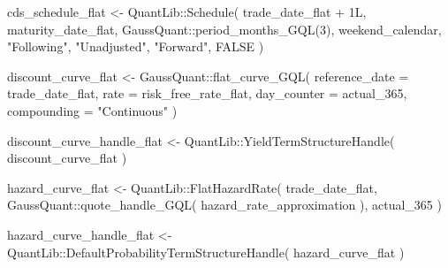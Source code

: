 \documentclass[
  letterpaper,
  DIV=11,
  numbers=noendperiod]{scrreprt}
\newenvironment{Shaded}{\begin{snugshade}}{\end{snugshade}}
\newcommand{\AttributeTok}[1]{\textcolor[rgb]{0.40,0.45,0.13}{#1}}
\newcommand{\ConstantTok}[1]{\textcolor[rgb]{0.56,0.35,0.01}{#1}}
\newcommand{\DecValTok}[1]{\textcolor[rgb]{0.68,0.00,0.00}{#1}}
\newcommand{\FunctionTok}[1]{\textcolor[rgb]{0.28,0.35,0.67}{#1}}
\newcommand{\NormalTok}[1]{\textcolor[rgb]{0.00,0.23,0.31}{#1}}
\newcommand{\OtherTok}[1]{\textcolor[rgb]{0.00,0.23,0.31}{#1}}
\newcommand{\SpecialCharTok}[1]{\textcolor[rgb]{0.37,0.37,0.37}{#1}}
\newcommand{\StringTok}[1]{\textcolor[rgb]{0.13,0.47,0.30}{#1}}
\begin{document}
\begin{Shaded}
\begin{Highlighting}[]
\NormalTok{cds\_schedule\_flat }\OtherTok{\textless{}{-}}\NormalTok{ QuantLib}\SpecialCharTok{::}\FunctionTok{Schedule}\NormalTok{(}
\NormalTok{  trade\_date\_flat }\SpecialCharTok{+} \DecValTok{1}\NormalTok{L,}
\NormalTok{  maturity\_date\_flat,}
\NormalTok{  GaussQuant}\SpecialCharTok{::}\FunctionTok{period\_months\_GQL}\NormalTok{(}\DecValTok{3}\NormalTok{),}
\NormalTok{  weekend\_calendar,}
  \StringTok{"Following"}\NormalTok{,}
  \StringTok{"Unadjusted"}\NormalTok{,}
  \StringTok{"Forward"}\NormalTok{,}
  \ConstantTok{FALSE}
\NormalTok{)}

\NormalTok{discount\_curve\_flat }\OtherTok{\textless{}{-}}\NormalTok{ GaussQuant}\SpecialCharTok{::}\FunctionTok{flat\_curve\_GQL}\NormalTok{(}
  \AttributeTok{reference\_date =}\NormalTok{ trade\_date\_flat,}
  \AttributeTok{rate =}\NormalTok{ risk\_free\_rate\_flat,}
  \AttributeTok{day\_counter =}\NormalTok{ actual\_365,}
  \AttributeTok{compounding =} \StringTok{"Continuous"}
\NormalTok{)}

\NormalTok{discount\_curve\_handle\_flat }\OtherTok{\textless{}{-}}\NormalTok{ QuantLib}\SpecialCharTok{::}\FunctionTok{YieldTermStructureHandle}\NormalTok{(}
\NormalTok{  discount\_curve\_flat}
\NormalTok{)}

\NormalTok{hazard\_curve\_flat }\OtherTok{\textless{}{-}}\NormalTok{ QuantLib}\SpecialCharTok{::}\FunctionTok{FlatHazardRate}\NormalTok{(}
\NormalTok{  trade\_date\_flat,}
\NormalTok{  GaussQuant}\SpecialCharTok{::}\FunctionTok{quote\_handle\_GQL}\NormalTok{(}
\NormalTok{    hazard\_rate\_approximation}
\NormalTok{  ),}
\NormalTok{  actual\_365}
\NormalTok{)}

\NormalTok{hazard\_curve\_handle\_flat }\OtherTok{\textless{}{-}}\NormalTok{ QuantLib}\SpecialCharTok{::}\FunctionTok{DefaultProbabilityTermStructureHandle}\NormalTok{(}
\NormalTok{  hazard\_curve\_flat}
\NormalTok{)}


\end{Highlighting}
\end{Shaded}
\end{document}
